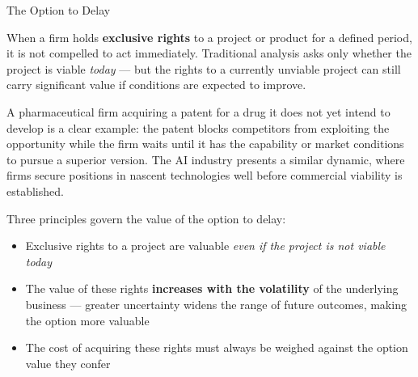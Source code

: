 \documentclass[10pt]{article}
\begin{document}
    \begin{core}{The Option to Delay}

      When a firm holds \textbf{exclusive rights} to a project or product for a defined period, it is not compelled to act immediately. Traditional analysis asks only whether the project is viable \textit{today} — but the rights to a currently unviable project can still carry significant value if conditions are expected to improve.

      A pharmaceutical firm acquiring a patent for a drug it does not yet intend to develop is a clear example: the patent blocks competitors from exploiting the opportunity while the firm waits until it has the capability or market conditions to pursue a superior version. The AI industry presents a similar dynamic, where firms secure positions in nascent technologies well before commercial viability is established.

      Three principles govern the value of the option to delay:

      \begin{itemize}

        \item Exclusive rights to a project are valuable \textit{even if the project is not viable today}

        \item The value of these rights \textbf{increases with the volatility} of the underlying business — greater uncertainty widens the range of future outcomes, making the option more valuable

        \item The cost of acquiring these rights must always be weighed against the option value they confer

      \end{itemize}


    \end{core}
\end{document}
